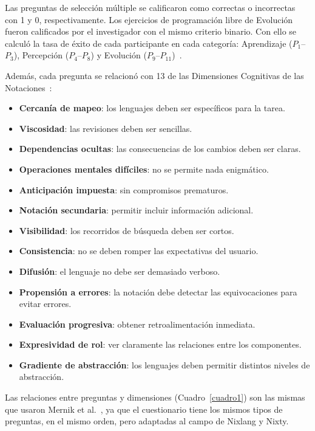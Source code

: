 Las preguntas de selección múltiple se calificaron como correctas o incorrectas con 1 y 0, respectivamente. Los ejercicios de programación libre de Evolución fueron calificados por el investigador con el mismo criterio binario. Con ello se calculó la tasa de éxito de cada participante en cada categoría: Aprendizaje ($P_1$--$P_3$), Percepción ($P_4$--$P_8$) y Evolución ($P_9$--$P_{11}$)~\cite{mernikPDFComparisonXAML2009}.

Además, cada pregunta se relacionó con 13 de las Dimensiones Cognitivas de las Notaciones~\cite{PDFCognitiveDimensions}:

\begin{itemize}
\item \textbf{Cercanía de mapeo}: los lenguajes deben ser específicos para la tarea.
\item \textbf{Viscosidad}: las revisiones deben ser sencillas.
\item \textbf{Dependencias ocultas}: las consecuencias de los cambios deben ser claras.
\item \textbf{Operaciones mentales difíciles}: no se permite nada enigmático.
\item \textbf{Anticipación impuesta}: sin compromisos prematuros.
\item \textbf{Notación secundaria}: permitir incluir información adicional.
\item \textbf{Visibilidad}: los recorridos de búsqueda deben ser cortos.
\item \textbf{Consistencia}: no se deben romper las expectativas del usuario.
\item \textbf{Difusión}: el lenguaje no debe ser demasiado verboso.
\item \textbf{Propensión a errores}: la notación debe detectar las equivocaciones para evitar errores.
\item \textbf{Evaluación progresiva}: obtener retroalimentación inmediata.
\item \textbf{Expresividad de rol}: ver claramente las relaciones entre los componentes.
\item \textbf{Gradiente de abstracción}: los lenguajes deben permitir distintos niveles de abstracción.
\end{itemize}

Las relaciones entre preguntas y dimensiones (Cuadro~\ref{cuadro1}) son las mismas que usaron Mernik et al.~\cite{mernikPDFComparisonXAML2009}, ya que el cuestionario tiene los mismos tipos de preguntas, en el mismo orden, pero adaptadas al campo de Nixlang y Nixty.

